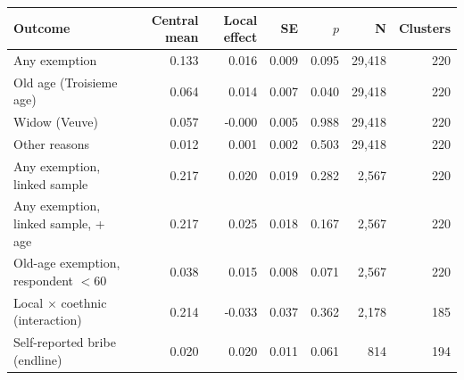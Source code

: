 \begin{tabular}{lrrrrrr}
\toprule
Outcome & Central mean & Local effect & SE & $p$ & N & Clusters \\
\midrule
Any exemption & 0.133 & 0.016 & 0.009 & 0.095 & 29,418 & 220 \\
\quad Old age (Troisieme age) & 0.064 & 0.014 & 0.007 & 0.040 & 29,418 & 220 \\
\quad Widow (Veuve) & 0.057 & -0.000 & 0.005 & 0.988 & 29,418 & 220 \\
\quad Other reasons & 0.012 & 0.001 & 0.002 & 0.503 & 29,418 & 220 \\
Any exemption, linked sample & 0.217 & 0.020 & 0.019 & 0.282 & 2,567 & 220 \\
Any exemption, linked sample, + age & 0.217 & 0.025 & 0.018 & 0.167 & 2,567 & 220 \\
Old-age exemption, respondent $<60$ & 0.038 & 0.015 & 0.008 & 0.071 & 2,567 & 220 \\
Local $\times$ coethnic (interaction) & 0.214 & -0.033 & 0.037 & 0.362 & 2,178 & 185 \\
Self-reported bribe (endline) & 0.020 & 0.020 & 0.011 & 0.061 & 814 & 194 \\
\bottomrule
\end{tabular}
